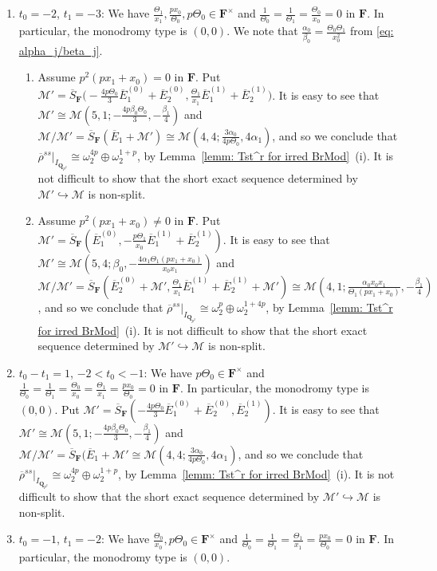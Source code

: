 \documentclass[11pt]{amsart}
\theoremstyle{definition}
\numberwithin{equation}{subsection}
\theoremstyle{plain}
\theoremstyle{plain}
\theoremstyle{plain}
\theoremstyle{plain}
\theoremstyle{plain}
\theoremstyle{plain}
\theoremstyle{plain}
\theoremstyle{plain}
\theoremstyle{plain}
\theoremstyle{plain}
\theoremstyle{plain}
\theoremstyle{plain}
\theoremstyle{definition}
\theoremstyle{definition}
\theoremstyle{definition}
\theoremstyle{remark}
\renewcommand{\(}{\textup{(}}
\renewcommand{\)}{\textup{)}}
\newcommand{\Q}{\mathbf{Q}}
\newcommand{\F}{\mathbf{F}}
\newcommand{\barS}{\overline{S}}
\newcommand{\rhobar}{\overline{\rho}}
\newcommand{\cM}{\mathcal{M}}
\newcommand{\barE}{\overline{E}}
\newcommand{\IQptwo}{{I_{\Q_{p^2}}}}
\begin{document}
\begin{enumerate}[leftmargin=*]
  \item $t_0=-2$, $t_1=-3$: We have $\frac{\Theta_1}{x_1},\frac{px_0}{\Theta_0},p\Theta_0\in\F^\times$ and $\frac{1}{\Theta_0}=\frac{1}{\Theta_1}=\frac{\Theta_0}{x_0}=0$ in $\F$. In particular, the monodromy type is $(0,0)$. We note that $\frac{\alpha_0}{\beta_0}=\frac{\Theta_0\Theta_1}{x_0^2}$ from \eqref{eq: alpha_j/beta_j}.
      \begin{enumerate}[leftmargin=*]
        \item Assume $p^2(px_1+x_0)=0$ in $\F$. Put $\cM'=\barS_{\F}\big(-\frac{4p\Theta_0}{3}\barE_1^{(0)}+\barE_2^{(0)}, \frac{\Theta_1}{x_1}\barE_1^{(1)}+\barE_2^{(1)}\big)$. It is easy to see that  $\cM'\cong\cM(5,1;-\frac{4p\beta_0\Theta_0}{3},-\frac{\beta_1}{4})$ and $\cM/\cM'=\barS_{\F}(\barE_1+\cM')\cong \cM(4,4;\frac{3\alpha_0}{4p\Theta_0},4\alpha_1)$, and so we conclude that $\rhobar^{ss}|_\IQptwo\cong\omega_2^{4p}\oplus\omega_2^{1+p}$, by Lemma~\ref{lemm: Tst^r for irred BrMod}~(i). It is not difficult to show that the short exact sequence determined by $\cM'\hookrightarrow \cM$ is non-split.
        \item Assume $p^2(px_1+x_0)\neq0$ in $\F$. Put
            $\cM'=\barS_{\F}(\barE_1^{(0)}, -\frac{p\Theta_1}{x_0}\barE_1^{(1)}+\barE_2^{(1)})$.
            It is easy to see that $\cM'\cong\cM(5,4;\beta_0,-\frac{4\alpha_1\Theta_1(px_1+x_0)}{x_0x_1})$ and $\cM/\cM'=\barS_{\F}(\barE_2^{(0)}+\cM', \frac{\Theta_1}{x_1}\barE_1^{(1)}+\barE_2^{(1)}+\cM') \cong\cM(4,1;\frac{\alpha_0x_0x_1}{\Theta_1(px_1+x_0)},-\frac{\beta_1}{4})$, and so we conclude that $\rhobar^{ss}|_\IQptwo\cong\omega_2^p\oplus\omega_2^{1+4p}$, by Lemma~\ref{lemm: Tst^r for irred BrMod}~(i). It is not difficult to show that the short exact sequence determined by $\cM'\hookrightarrow \cM$ is non-split.
      \end{enumerate}
  \item $t_0-t_1=1$, $-2<t_0<-1$: We have $p\Theta_0\in\F^\times$ and $\frac{1}{\Theta_0}=\frac{1}{\Theta_1}=\frac{\Theta_0}{x_0}=\frac{\Theta_1}{x_1}=\frac{px_0}{\Theta_0}=0$ in $\F$. In particular, the monodromy type is $(0,0)$. Put $\cM'=\barS_{\F}(-\frac{4p\Theta_0}{3}\barE_1^{(0)}+\barE_2^{(0)},\barE_2^{(1)})$. It is easy to see that $\cM'\cong\cM(5,1;-\frac{4p\beta_0\Theta_0}{3},-\frac{\beta_1}{4})$ and $\cM/\cM'=\barS_{\F}(\barE_1+\cM'\cong\cM(4,4;\frac{3\alpha_0}{4p\Theta_0},4\alpha_1)$, and so we conclude that $\rhobar^{ss}|_\IQptwo\cong\omega_2^{4p}\oplus\omega_2^{1+p}$, by Lemma~\ref{lemm: Tst^r for irred BrMod}~(i). It is not difficult to show that the short exact sequence determined by $\cM'\hookrightarrow \cM$ is non-split.
  \item $t_0=-1$, $t_1=-2$: We have $\frac{\Theta_0}{x_0},p\Theta_0\in\F^\times$ and $\frac{1}{\Theta_0}=\frac{1}{\Theta_1}=\frac{\Theta_1}{x_1}=\frac{px_0}{\Theta_0}=0$ in $\F$. In particular, the monodromy type is $(0,0)$.


\end{enumerate}
\end{document}
